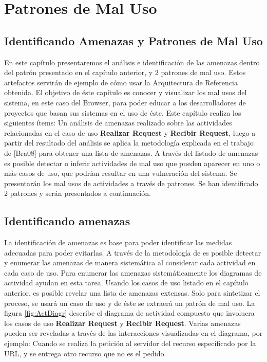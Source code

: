 \chapter{Patrones de Mal Uso}
\label{chap6:Misuse}


\section{Identificando Amenazas y Patrones de Mal Uso}
En este capítulo presentaremos el análisis e identificación de las amenazas dentro del patrón presentado en el capítulo anterior, y 2 patrones de mal uso. Estos artefactos servirán de ejemplo de cómo usar la Arquitectura de Referencia obtenida. El objetivo de éste capítulo es conocer y visualizar los mal usos del sistema, en este caso del Browser, para poder educar a los desarrolladores de proyectos que basan sus sistemas en el uso de éste.
Este capítulo realiza los siguientes ítems: Un análisis de amenazas realizado sobre las actividades relacionadas en el caso de uso \textbf{Realizar Request} y \textbf{Recibir Request}, luego a partir del resultado del análisis se aplica la metodología explicada en el trabajo de [Bra08] para obtener una lista de amenazas. A través del listado de amenazas es posible detectar o inferir actividades de mal uso que pueden aparecer en uno o más casos de uso, que podrían resultar en una vulneración del sistema. Se presentarán los mal usos de actividades a través de patrones. Se han identificado 2 patrones y serán presentados a continuación.

\section{Identificando amenazas}
La identificación de amenazas es base para poder identificar las medidas adecuadas para poder evitarlas. A través de la metodología de \cite{braz2008eliciting} es posible detectar y enumerar las amenazas de manera sistemática al considerar cada actividad en cada caso de uso. Para enumerar las amenazas sistemáticamente los diagramas de actividad ayudan en esta tarea.
Usando los casos de uso listado en el capítulo anterior, es posible revelar una lista de amenazas extensas. Solo para sintetizar el proceso, se usará un caso de uso y de éste se extraerá un patrón de mal uso.
La figura \ref{fig:ActDiagr} describe el diagrama de actividad compuesto que involucra los casos de uso \textbf{Realizar Request} y \textbf{Recibir Request}. Varias amenazas pueden ser reveladas a través de las interacciones visualizadas en el diagrama, por ejemplo: Cuando se realiza la petición al servidor del recurso especificado por la URL, y se entrega otro recurso que no es el pedido. 

